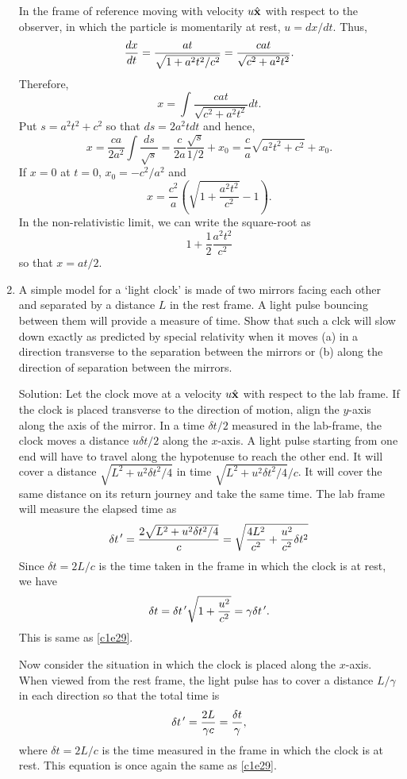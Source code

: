 \begin{enumerate}
In the frame of reference moving with velocity $u\hat{\mathbf{x}}$ with respect to the 
observer, in which the particle is momentarily at rest, $u = dx/dt$. Thus,
\[
\frac{d{x}}{d{t}} = \frac{at}{\sqrt{1 + a^2t^2/c^2}} = \frac{cat}{\sqrt{c^2 + a^2t^2}}.
\]
Therefore,
\[
x = \int \frac{cat}{\sqrt{c^2 + a^2t^2}}dt.
\]
Put $s = a^2t^2 + c^2$ so that $ds = 2a^2tdt$ and hence,
\[
x = \frac{ca}{2a^2} \int \frac{ds}{\sqrt{s}} = 
\frac{c}{2a}\frac{\sqrt{s}}{1/2} + x_0
= \frac{c}{a}\sqrt{a^2t^2 + c^2} + x_0.
\] 
If $x = 0$ at $t = 0$, $x_0 = -c^2/a^2$ and 
\begin{equation}\label{c1e102}
x = \frac{c^2}{a}\left(\sqrt{1 + \frac{a^2t^2}{c^2}} - 1\right).
\end{equation}
In the non-relativistic limit, we can write the square-root as 
\[
1 + \frac{1}{2}\frac{a^2t^2}{c^2}
\]
so that $x = at/2$.

\item A simple model for a `light clock' is made of two mirrors facing each 
other and separated by a distance $L$ in the rest frame. A light pulse bouncing
between them will provide a measure of time. Show that such a clck will slow
down exactly as predicted by special relativity when it moves (a) in a direction
transverse to the separation between the mirrors or (b) along the direction of
separation between the mirrors.\cite{pg}
\item[Solution:]
Let the clock move at a velocity $u\hat{\mathbf{x}}$ with respect to the lab frame. If
the clock is placed transverse to the direction of motion, align the $y$-axis
along the axis of the mirror. In a time $\delta t/2$ measured in the lab-frame,
the clock moves a distance $u\delta t/2$ along the $x$-axis. A light pulse 
starting from one end will have to travel along the hypotenuse to reach the 
other end. It will cover a distance $\sqrt{L^2 + u^2\delta t^2/4}$ in time
$\sqrt{L^2 + u^2\delta t^2/4}/c$. It will cover the same distance on its return
journey and take the same time. The lab frame will measure the elapsed time as
\[
\delta t^{\,\prime} = \frac{2\sqrt{L^2 + u^2\delta t^2/4}}{c} =
\sqrt{\frac{4L^2}{c^2} + \frac{u^2}{c^2}\delta t^2} 
\]
Since $\delta t = 2L/c$ is the time taken in the frame in which the clock is
at rest, we have
\[
\delta t = \delta t^{\,\prime}\sqrt{1 + \frac{u^2}{c^2}} = \gamma\delta t^{\,\prime}.
\]
This is same as \eqref{c1e29}.

Now consider the situation in which the clock is placed along the $x$-axis.
When viewed from the rest frame, the light pulse has to cover a distance
$L/\gamma$ in each direction so that the total time is
\[
\delta t^{\,\prime} = \frac{2L}{\gamma c} = \frac{\delta t}{\gamma},
\]
where $\delta t = 2L/c$ is the time measured in the frame in which the clock
is at rest. This equation is once again the same as \eqref{c1e29}.


\end{enumerate}
